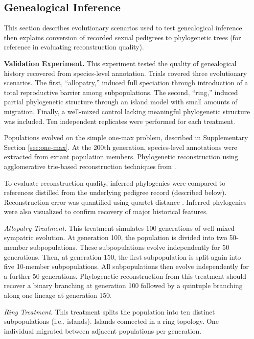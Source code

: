 \subsection{Genealogical Inference}
\label{sec:genealogical-inference}

This section describes evolutionary scenarios used to test genealogical inference then explains conversion of recorded sexual pedigrees to phylogenetic trees (for reference in evaluating reconstruction quality).

\textbf{Validation Experiment.}
This experiment tested the quality of genealogical history recovered from species-level  annotation.
Trials covered three evolutionary scenarios.
The first, ``allopatry,'' induced full speciation through introduction of a total reproductive barrier among subpopulations.
The second, ``ring,'' induced partial phylogenetic structure through an island model with small amounts of migration.
Finally, a well-mixed control lacking meaningful phylogenetic structure was included.
Ten independent replicates were performed for each treatment.

Populations evolved on the simple one-max problem, described in Supplementary Section \ref{sec:one-max}.
At the 200th generation, species-level annotations were extracted from extant population members.
Phylogenetic reconstruction using agglomerative trie-based reconstruction techniques from \citep{moreno2023toward}.

To evaluate reconstruction quality, inferred phylogenies were compared to references distilled from the underlying pedigree record (described below).
Reconstruction error was quantified using quartet distance \citep{estabrook1985comparison,sand2014tqdist}.
Inferred phylogenies were also visualized to confirm recovery of major historical features.

\textit{Allopatry Treatment.}
This treatment simulates 100 generations of well-mixed sympatric evolution.
At generation 100, the population is divided into two 50-member subpopulations.
These subpopulations evolve independently for 50 generations.
Then, at generation 150, the first subpopulation is split again into five 10-member subpopulations.
All subpopulations then evolve independently for a further 50 generations.
Phylogenetic reconstruction from this treatment should recover a binary branching at generation 100 followed by a quintuple branching along one lineage at generation 150.

\textit{Ring Treatment.}
This treatment splits the population into ten distinct subpopulations (i.e., islands).
Islands connected in a ring topology.
One individual migrated between adjacent populations per generation.

